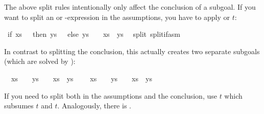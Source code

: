 \begin{isabellebody}
\begin{isamarkuptext}
The above split rules intentionally only affect the conclusion of a
subgoal.  If you want to split an  or -expression in
the assumptions, you have to apply  or
$t$:%
\end{isamarkuptext}%
\ {\isachardoublequote}if\ xs\ {\isacharequal}\ {\isacharbrackleft}{\isacharbrackright}\ then\ ys\ {\isasymnoteq}\ {\isacharbrackleft}{\isacharbrackright}\ else\ ys\ {\isacharequal}\ {\isacharbrackleft}{\isacharbrackright}\ {\isasymLongrightarrow}\ xs\ {\isacharat}\ ys\ {\isasymnoteq}\ {\isacharbrackleft}{\isacharbrackright}{\isachardoublequote}\isanewline
{}split\ split{\isacharunderscore}if{\isacharunderscore}asm{\isacharparenright}%
\begin{isamarkuptxt}%
\noindent
In contrast to splitting the conclusion, this actually creates two
separate subgoals (which are solved by ):
\begin{isabelle}%
\ {}{\isachardot}\ xs\ {\isacharequal}\ {\isacharbrackleft}{\isacharbrackright}\ {\isasymLongrightarrow}\ ys\ {\isasymnoteq}\ {\isacharbrackleft}{\isacharbrackright}\ {\isasymLongrightarrow}\ xs\ {\isacharat}\ ys\ {\isasymnoteq}\ {\isacharbrackleft}{\isacharbrackright}\isanewline
\ {}{\isachardot}\ xs\ {\isasymnoteq}\ {\isacharbrackleft}{\isacharbrackright}\ {\isasymLongrightarrow}\ ys\ {\isacharequal}\ {\isacharbrackleft}{\isacharbrackright}\ {\isasymLongrightarrow}\ xs\ {\isacharat}\ ys\ {\isasymnoteq}\ {\isacharbrackleft}{\isacharbrackright}%
\end{isabelle}
If you need to split both in the assumptions and the conclusion,
use $t$ which subsumes $t$ and
$t$. Analogously, there is .


\end{isamarkuptxt}
\end{isabellebody}
